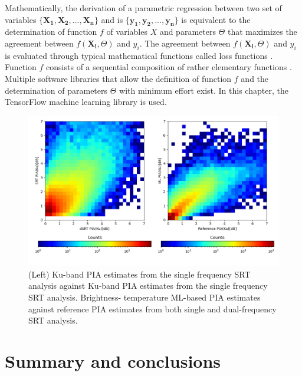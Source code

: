 \documentclass[10pt]{ietbook}
\begin{document}
Mathematically, the derivation of a parametric regression between two set of variables $\{\mathbf{X_1,X_2,...,X_n}\}$ and is $\{\mathbf{y_1,y_2,...,y_n}\}$ is 
equivalent to the determination of function $f$ of variables $X$ and parameters $\Theta$ that maximizes the agreement between $f(\mathbf{ X_i},\Theta)$ and $y_i$.
The agreement between $f(\mathbf{ X_i},\Theta)$ and $y_i$ is evaluated through typical mathematical functions called loss functions \cite{deeplearning2016}.
Function $f$ consists of a sequential composition of rather elementary functions \cite{deeplearning2016}.
Multiple software libraries that allow the definition of function $f$ and the determination of parameters $\Theta$ with minimum effort exist.  In this 
chapter, the TensorFlow machine learning library \cite{tensorflow2015} is used.


\begin{figure} \label{fig:ML_PIA}
    \centerline{}
    \includegraphics[width=\textwidth]{ML_PIA.png}
    
    \caption{(Left) Ku-band PIA estimates from the single frequency SRT analysis against Ku-band PIA estimates from the single frequency SRT analysis. Brightness-
    temperature ML-based PIA estimates against reference PIA estimates from both single and dual-frequency SRT analysis.}
\end{figure}

\section{Summary and conclusions}


\end{document}
